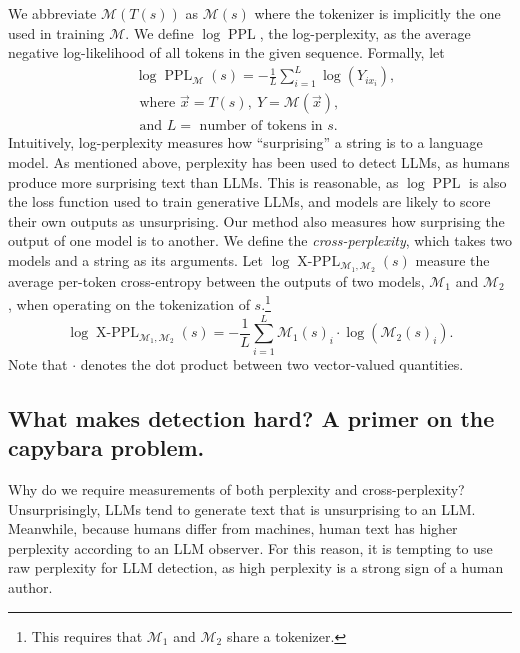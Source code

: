 \documentclass{article} %
\DeclareMathOperator{\PPL}{PPL} %
\DeclareMathOperator{\xPPL}{X-PPL} %
\newcommand{\update}[1]{{{#1}}}
\begin{document}
We abbreviate $\mathcal M(T(s))$ as $\mathcal M(s)$ where the tokenizer is implicitly the one used in training $\mathcal M$.
We define $\log \PPL$, the log-perplexity, as the average negative log-likelihood of all tokens in the given sequence.
Formally, let
\begin{equation}
    \begin{aligned}
    &\log \PPL_\mathcal M (s) = - \frac{1}{L} \sum_{i = 1}^L \log(Y_{ix_i}), \\
    &\text{ where }\vec x = T(s),~ Y = \mathcal M(\vec x), \\&\text{ and }
    L = \text{ number of tokens in }s.
    \end{aligned}
\end{equation}
Intuitively, log-perplexity measures how ``surprising'' a string is to a language model. As mentioned above, perplexity has been used to detect LLMs, as humans produce more surprising text than LLMs.
This is reasonable, as $\log \PPL$ is also the loss function used to train generative LLMs, and models are likely to score their own outputs as unsurprising.
Our method also measures how surprising the output of one model is to another.
We define the \emph{cross-perplexity}, which takes two models and a string as its arguments.
Let $\update{\log} \xPPL_{\mathcal M_1, \mathcal M_2}(s)$ measure the average per-token cross-entropy between the outputs of two models, $\mathcal M_1$ and $\mathcal M_2$ , when operating on the tokenization of $s$.\footnote{This requires that $\mathcal M_1$ and $\mathcal M_2$ share a tokenizer.}
\begin{equation}
    \update{\log} \xPPL_{\mathcal M_1, \mathcal M_2}(s) = - \frac{1}{L} \sum_{i = 1}^L \mathcal M_1(\update{s})_i \cdot \log\left(\mathcal M_2(\update{s})_i\right).
    \label{cross-ppl-equation}
\end{equation}
Note that $\cdot$ denotes the dot product between two vector-valued quantities.

\subsection{What makes detection hard? A primer on the capybara problem.}

Why do we require measurements of both perplexity and cross-perplexity? Unsurprisingly, LLMs tend to generate text that is unsurprising to an LLM. Meanwhile, because humans differ from machines, human text has higher perplexity according to an LLM observer. For this reason, it is tempting to use raw perplexity for LLM detection, as high perplexity is a strong sign of a human author.
\end{document}
